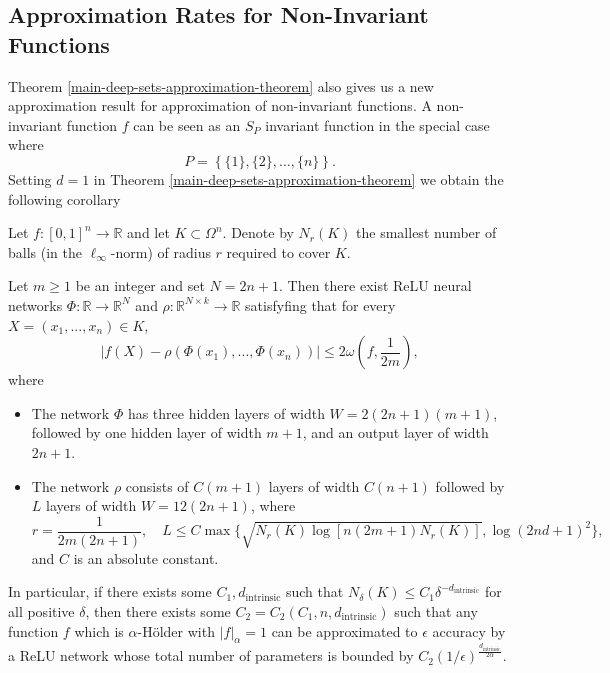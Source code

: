 \documentclass[twoside,11pt]{article}
\begin{document}
\subsection{Approximation Rates for Non-Invariant Functions}
 Theorem \ref{main-deep-sets-approximation-theorem} also gives us a new approximation result for approximation of non-invariant functions. A non-invariant function $f$ can be seen as an $S_P$ invariant function in the special case where 
 $$P=\left\{ \{1\}, \{2\},\ldots,\{n\}              \right\} .$$
 Setting $d=1$ in Theorem \ref{main-deep-sets-approximation-theorem} we obtain the following corollary
 \begin{cor}\label{cor:intrinsic}
Let $f:[0,1]^n\rightarrow \mathbb{R}$ and let $K\subset \Omega^n$. Denote by $N_r(K)$ the smallest number of balls (in the $\ell_\infty$-norm) of radius $r$ required to cover $K$.
	
	Let $m \geq 1$ be an integer and set $N = 2n+1$. Then there exist ReLU neural networks $\Phi:\mathbb{R}\rightarrow \mathbb{R}^N$ and $\rho:\mathbb{R}^{N\times k}\rightarrow \mathbb{R}$ satisfyfing that 	for every $X = (x_1,...,x_n)\in K$,
		\begin{equation}\label{deep-sets-equation-bound-non-inv}
		\left|f(X) - \rho\left(\Phi(x_1),...,\Phi(x_n)\right)\right| \leq 2\omega\left(f,\frac{1}{2m}\right),
	\end{equation}
	where
	\begin{itemize}
		\item The network $\Phi$ has three hidden layers of width $W = 2(2n+1)(m+1)$, followed by one hidden layer of width $m+1$, and an output layer of width $2n+1$.
		\item The network $\rho$ consists of $C(m+1)$ layers of width $C(n+1)$ followed by $L$ layers of width $W = 12(2n+1)$, where
		$$r = \frac{1}{2m(2n+1)}, \quad L \leq C\max\{\sqrt{N_r(K)\log[n(2m+1)N_r(K)]},\log(2nd+1)^2\},$$
	and $C$ is an absolute constant.
	\end{itemize}

 In particular, if there exists some $C_1,d_{\text{intrinsic}} $ such that  $N_\delta(K)\leq C_1\delta^{-d_{\text{intrinsic}}}$ for all positive $\delta$, then there exists some $C_2=C_2(C_1,n,d_{\text{intrinsic}}) $ such that any function $f$ which is $\alpha$-H\"older with $|f|_\alpha=1 $ can be approximated to $\epsilon$ accuracy by a ReLU network whose total number of parameters is bounded by $C_2(1/\epsilon)^{\frac{d_{\text{intrinsic}}}{2\alpha}}$.
 \end{cor}
\end{document}

